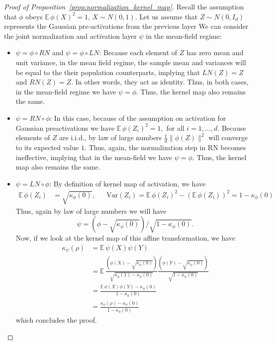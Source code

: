 \documentclass[twoside]{article}
\newcommand{\km}{\kappa_\phi}
\newcommand{\E}{\mathbb{E}\,}
\theoremstyle{definition}
\begin{document}
\begin{proof}[Proof of Proposition~\ref{prop:normalization_kernel_map}]
Recall the assumption that $\phi$ obeys $\E \phi(X)^2 = 1,\, X\sim N(0,1). $ Let us assume that $Z\sim N(0,I_d)$ represents the Gaussian pre-activations from the previous layer We can consider the joint normalization and activation layer $\psi$ in the mean-field regime: 
\begin{itemize}
    \item $\psi = \phi\circ RN$ and $\psi = \phi\circ LN$: Because each element of $Z$ has zero mean and unit variance, in the mean field regime, the sample mean and variances will be equal to the their population counterparts, implying that $LN(Z) = Z$ and $RN(Z) = Z.$ In other words, they act as identity. Thus, in both cases, in the mean-field regime we have $\psi = \phi.$ Thus, the kernel map also remains the same. 
    \item $\psi = RN \circ \phi$: In this case, because of the assumption on activation for Gaussian preactivations we have $\E \phi(Z_i)^2 = 1,$ for all $i=1,\dots, d.$ Because elements of $Z$ are i.i.d., by law of large numbers $\frac1d\|\phi(Z)\|^2$ will converge to its expected value $1.$ Thus, again, the normalization step in RN becomes ineffective, implying that in the mean-field we have $\psi = \phi.$ Thus, the kernel map also remains the same. 
    \item $\psi = LN \circ \phi$: By definition of kernel map of activation, we have  
     \begin{align*}
         \E \phi(Z_i) &= \sqrt{\km(0)}, 
        && \mathrm{Var}(Z_i) = \E \phi(Z_i)^2 - (\E \phi(Z_i))^2 =  1- \km(0)
     \end{align*}
    Thus, again by law of large numbers we will have 
    $$\psi = (\phi - \sqrt{\km(0)})/\sqrt{1 - \km(0)}.$$ Now, if we look at the kernel map of this affine transformation, we have 
     \begin{align*}
     \kappa_\psi(\rho) &= \E \psi(X)\psi(Y)\\
     &= \E \frac{(\phi(X)-\sqrt{\km(0)} )}{\sqrt{\km(1)-\km(0)}}\frac{(\phi(Y)-\sqrt{\km(0)} )}{\sqrt{1-\km(0)}}\\
     &= \frac{\E \phi(X)\phi(Y) - \km(0)}{1-\km(0)}\\
     &= \frac{\km(\rho)-\km(0)}{1-\km(0)}
     \end{align*}
    which concludes the proof. 
\end{itemize}

\end{proof}
\end{document}
